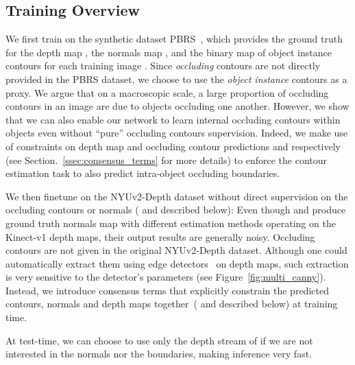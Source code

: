 \documentclass[10pt,twocolumn,letterpaper]{article}
\begin{document}
\subsection{Training Overview}

We first  train   on the  synthetic dataset  PBRS~\cite{Zhang2016pbrs}, which
provides the ground truth for the depth map  , the normals map , 
and the binary map of object instance contours  for  each training  image 
. Since \textit{occluding} contours are not directly provided in the PBRS 
dataset, we choose to use the \textit{object instance} contours  as a 
proxy. We argue that on a macroscopic scale, a large proportion of occluding 
contours in an image are due to objects occluding one another.
However, we show that we can also enable our network to learn internal 
occluding contours within objects even without ``pure'' occluding contours 
supervision. Indeed, we make use of constraints on depth map and occluding 
contour predictions  and  respectively (see 
Section.~\ref{ssec:consensus_terms} for more details) to enforce the contour 
estimation task to also predict intra-object occluding boundaries.

We then finetune  on the NYUv2-Depth dataset without direct supervision 
on the  occluding contours or normals  ( and 
described  below): Even  though  \cite{LadickyCVPR14}  and \cite{Nyuv2}  produce
ground  truth normals  map with  different estimation  methods operating  on the
Kinect-v1  depth  maps, their  output  results  are generally  noisy.  Occluding
contours are not given in the  original NYUv2-Depth dataset.  Although one could
automatically extract  them using edge  detectors~\cite{Canny,StructuredEdge} on
depth maps, such extraction is very  sensitive to the detector's parameters (see
Figure~\ref{fig:multi_canny}).  Instead,  we introduce consensus terms  that
explicitly   constrain  the   predicted  contours,   normals  and   depth  maps
together~( and  described below) at training time.

At test-time, we can choose to use only the depth stream of  if we are not
interested in the normals nor the boundaries, making inference very fast.
\end{document}
